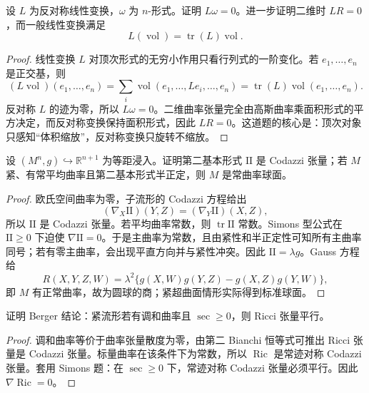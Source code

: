 \documentclass[11pt,a4paper,openany]{ctexbook}
\numberwithin{equation}{chapter}
\begin{document}
\begin{exercise}
设 \(L\) 为反对称线性变换，\(\omega\) 为 \(n\)-形式。证明 \(L\omega=0\)。进一步证明二维时 \(LR=0\)，而一般线性变换满足
\[
L(\operatorname{vol})=\operatorname{tr}(L)\operatorname{vol}.
\]
\end{exercise}
\begin{proof}
线性变换 \(L\) 对顶次形式的无穷小作用只看行列式的一阶变化。若 \(e_1,\ldots,e_n\) 是正交基，则
\[
(L\operatorname{vol})(e_1,\ldots,e_n)=\sum_i \operatorname{vol}(e_1,\ldots,Le_i,\ldots,e_n)=\operatorname{tr}(L)\operatorname{vol}(e_1,\ldots,e_n).
\]
反对称 \(L\) 的迹为零，所以 \(L\omega=0\)。二维曲率张量完全由高斯曲率乘面积形式的平方决定，而反对称变换保持面积形式，因此 \(LR=0\)。这道题的核心是：顶次对象只感知“体积缩放”，反对称变换只旋转不缩放。
\end{proof}

\begin{exercise}
设 \((M^n,g)\hookrightarrow\mathbb R^{n+1}\) 为等距浸入。证明第二基本形式 \(\mathrm{II}\) 是 Codazzi 张量；若 \(M\) 紧、有常平均曲率且第二基本形式半正定，则 \(M\) 是常曲率球面。
\end{exercise}
\begin{proof}
欧氏空间曲率为零，子流形的 Codazzi 方程给出
\[
(\nabla_X\mathrm{II})(Y,Z)=(\nabla_Y\mathrm{II})(X,Z),
\]
所以 \(\mathrm{II}\) 是 Codazzi 张量。若平均曲率常数，则 \(\operatorname{tr}\mathrm{II}\) 常数。Simons 型公式在 \(\mathrm{II}\ge0\) 下迫使 \(\nabla\mathrm{II}=0\)。于是主曲率为常数，且由紧性和半正定性可知所有主曲率同号；若有零主曲率，会出现平直方向并与紧性冲突。因此 \(\mathrm{II}=\lambda g\)。Gauss 方程给
\[
R(X,Y,Z,W)=\lambda^2\{g(X,W)g(Y,Z)-g(X,Z)g(Y,W)\},
\]
即 \(M\) 有正常曲率，故为圆球的商；紧超曲面情形实际得到标准球面。
\end{proof}

\begin{exercise}
证明 Berger 结论：紧流形若有调和曲率且 \(\sec\ge0\)，则 Ricci 张量平行。
\end{exercise}
\begin{proof}
调和曲率等价于曲率张量散度为零，由第二 Bianchi 恒等式可推出 Ricci 张量是 Codazzi 张量。标量曲率在该条件下为常数，所以 \(\operatorname{Ric}\) 是常迹对称 Codazzi 张量。套用 Simons 题：在 \(\sec\ge0\) 下，常迹对称 Codazzi 张量必须平行。因此 \(\nabla\operatorname{Ric}=0\)。
\end{proof}
\end{document}
